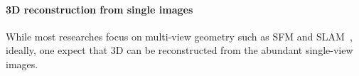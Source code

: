 \label{sec:related}


\paragraph{3D reconstruction from single images}
While most researches focus on multi-view geometry such as SFM and SLAM~\cite{haming2010structure, fuentes2015visual}, ideally, one expect that 3D can be reconstructed from the abundant single-view images. 

